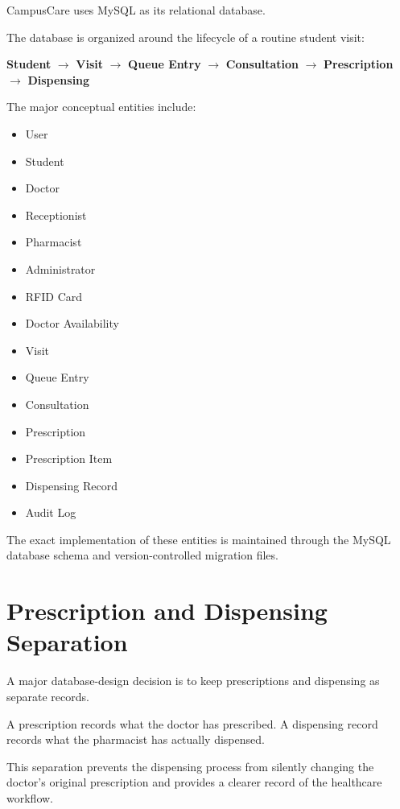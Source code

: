 \documentclass{tietreport}
\begin{document}
CampusCare uses MySQL as its relational database.

The database is organized around the lifecycle of a routine student
visit:

\begin{center}
\textbf{Student}
$\rightarrow$
\textbf{Visit}
$\rightarrow$
\textbf{Queue Entry}
$\rightarrow$
\textbf{Consultation}
$\rightarrow$
\textbf{Prescription}
$\rightarrow$
\textbf{Dispensing}
\end{center}

The major conceptual entities include:

\begin{itemize}
    \item User
    \item Student
    \item Doctor
    \item Receptionist
    \item Pharmacist
    \item Administrator
    \item RFID Card
    \item Doctor Availability
    \item Visit
    \item Queue Entry
    \item Consultation
    \item Prescription
    \item Prescription Item
    \item Dispensing Record
    \item Audit Log
\end{itemize}

The exact implementation of these entities is maintained through the
MySQL database schema and version-controlled migration files.

\section{Prescription and Dispensing Separation}

A major database-design decision is to keep prescriptions and
dispensing as separate records.

A prescription records what the doctor has prescribed. A dispensing
record records what the pharmacist has actually dispensed.

This separation prevents the dispensing process from silently
changing the doctor's original prescription and provides a clearer
record of the healthcare workflow.
\end{document}
